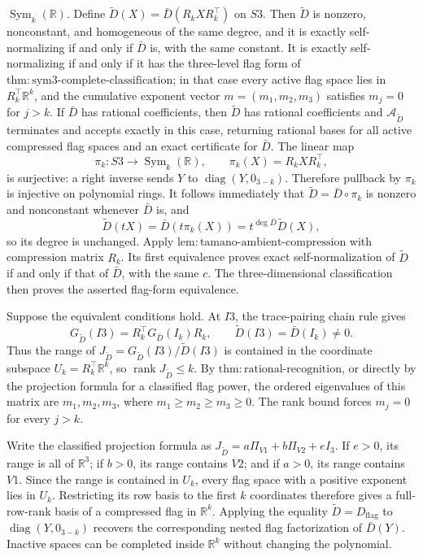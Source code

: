 \(\operatorname{Sym}_k(\mathbb R)\).  Define
\(\widetilde D(X)=\bar D(R_kXR_k^{\top})\) on \(S3\).  Then
\(\widetilde D\) is nonzero, nonconstant, and homogeneous of the same
degree, and it is exactly self-normalizing if and only if \(\bar D\) is,
with the same constant.  It is exactly self-normalizing if and only if
it has the three-level flag form of
\(\mathrm{thm{:}sym3\text{-}complete\text{-}classification}\); in that
case every active flag space lies in
\(R_k^{\top}\mathbb R^k\), and the cumulative exponent vector
\(m=(m_1,m_2,m_3)\) satisfies \(m_j=0\) for \(j>k\).  If \(\bar D\)
has rational coefficients, then \(\widetilde D\) has rational
coefficients and \(\mathcal A_{\widetilde D}\) terminates and accepts
exactly in this case, returning rational bases for all active compressed
flag spaces and an exact certificate for \(\bar D\).
The linear map
\[
 \pi_k:S3\longrightarrow\operatorname{Sym}_k(\mathbb R),
 \qquad \pi_k(X)=R_kXR_k^{\top},
\]
is surjective: a right inverse sends \(Y\) to
\(\operatorname{diag}(Y,0_{3-k})\).  Therefore pullback by \(\pi_k\)
is injective on polynomial rings.  It follows immediately that
\(\widetilde D=\bar D\circ\pi_k\) is nonzero and nonconstant whenever
\(\bar D\) is, and
\[
 \widetilde D(tX)
 =\bar D(t\pi_k(X))
 =t^{\deg\bar D}\widetilde D(X),
\]
so its degree is unchanged.  Apply
\(\mathrm{lem{:}tamano\text{-}ambient\text{-}compression}\) with
compression matrix \(R_k\).  Its first equivalence proves exact
self-normalization of \(\widetilde D\) if and only if that of \(\bar D\),
with the same \(c\).  The three-dimensional classification then proves
the asserted flag-form equivalence.

Suppose the equivalent conditions hold.  At \(I3\), the trace-pairing
chain rule gives
\[
 G_{\widetilde D}(I3)
 =R_k^{\top}G_{\bar D}(I_k)R_k,
 \qquad
 \widetilde D(I3)=\bar D(I_k)\neq0.
\]
Thus the range of
\(J_{\widetilde D}=G_{\widetilde D}(I3)/\widetilde D(I3)\) is contained
in the coordinate subspace \(U_k=R_k^{\top}\mathbb R^k\), so
\(\operatorname{rank}J_{\widetilde D}\leq k\).  By
\(\mathrm{thm{:}rational\text{-}recognition}\), or directly by the
projection formula for a classified flag power, the ordered eigenvalues
of this matrix are \(m_1,m_2,m_3\), where
\(m_1\geq m_2\geq m_3\geq0\).  The rank bound forces
\(m_j=0\) for every \(j>k\).

Write the classified projection formula as
\(J_{\widetilde D}=a\Pi_{V1}+b\Pi_{V2}+eI_3\).  If \(e>0\), its range
is all of \(\mathbb R^3\); if \(b>0\), its range contains \(V2\); and
if \(a>0\), its range contains \(V1\).  Since the range is contained in
\(U_k\), every flag space with a positive exponent lies in \(U_k\).
Restricting its row basis to the first \(k\) coordinates therefore gives
a full-row-rank basis of a compressed flag in \(\mathbb R^k\).  Applying
the equality \(\widetilde D=D_{\mathrm{flag}}\) to
\(\operatorname{diag}(Y,0_{3-k})\) recovers the corresponding nested
flag factorization of \(\bar D(Y)\).  Inactive spaces can be completed
inside \(\mathbb R^k\) without changing the polynomial.

